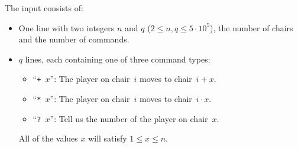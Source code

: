 
The input consists of:
\begin{itemize}
  \item
  One line with two integers $n$ and $q$ ($2\leq n,q\leq5\cdot10^5$), the number of chairs and the number of commands.
  \item
  $q$ lines, each containing one of three command types:
  \begin{itemize}[topsep=0pt, itemsep=-2pt]
  \item ``\texttt{+~$x$}'': The player on chair~$i$ moves to chair~$i+x$.
  \item ``\texttt{*~$x$}'': The player on chair~$i$ moves to chair~$i\cdot{}x$.
  \item ``\texttt{?~$x$}'': Tell us the number of the player on chair~$x$.
  \end{itemize}
  All of the values $x$ will satisfy $1 \leq x \leq n$.
  \end{itemize}

